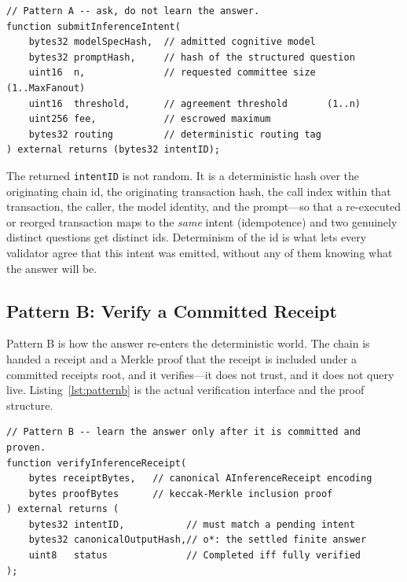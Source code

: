 \begin{lstlisting}[language=Solidity,caption={Pattern A: a deterministic chain emits an intent. The call records a question and returns a deterministic id; it cannot return an answer (Lux \texttt{aivmbridge}, selector \texttt{0x10000000}).},label=lst:patterna]
// Pattern A -- ask, do not learn the answer.
function submitInferenceIntent(
    bytes32 modelSpecHash,  // admitted cognitive model
    bytes32 promptHash,     // hash of the structured question
    uint16  n,              // requested committee size  (1..MaxFanout)
    uint16  threshold,      // agreement threshold       (1..n)
    uint256 fee,            // escrowed maximum
    bytes32 routing         // deterministic routing tag
) external returns (bytes32 intentID);
\end{lstlisting}

The returned \texttt{intentID} is not random. It is a deterministic hash over the originating chain id, the originating transaction hash, the call index within that transaction, the caller, the model identity, and the prompt---so that a re-executed or reorged transaction maps to the \emph{same} intent (idempotence) and two genuinely distinct questions get distinct ids. Determinism of the id is what lets every validator agree that this intent was emitted, without any of them knowing what the answer will be.

\subsection{Pattern B: Verify a Committed Receipt}

Pattern B is how the answer re-enters the deterministic world. The chain is handed a \PoT{} receipt and a Merkle proof that the receipt is included under a committed receipts root, and it verifies---it does not trust, and it does not query \AChain{} live. Listing~\ref{lst:patternb} is the actual verification interface and the proof structure.

\begin{lstlisting}[language=Solidity,caption={Pattern B: a deterministic chain verifies a committed receipt against committed state. No live query to the cognition chain occurs; verification is a pure function of the inputs (Lux \texttt{aivmbridge}, selector \texttt{0x11000000}).},label=lst:patternb]
// Pattern B -- learn the answer only after it is committed and proven.
function verifyInferenceReceipt(
    bytes receiptBytes,   // canonical AInferenceReceipt encoding
    bytes proofBytes      // keccak-Merkle inclusion proof
) external returns (
    bytes32 intentID,           // must match a pending intent
    bytes32 canonicalOutputHash,// o*: the settled finite answer
    uint8   status              // Completed iff fully verified
);
\end{lstlisting}

